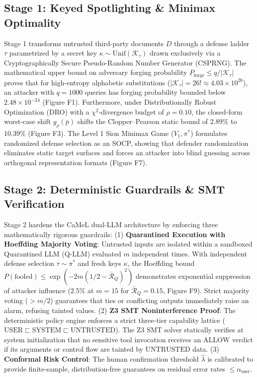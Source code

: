 \documentclass[10pt,a4paper]{article}
\begin{document}
\subsection{Stage 1: Keyed Spotlighting \& Minimax Optimality}
Stage 1 transforms untrusted third-party documents $D$ through a defense ladder $\tau$ parametrized by a secret key $\kappa \sim \mathrm{Unif}(\mathcal{K}_\tau)$ drawn exclusively via a Cryptographically Secure Pseudo-Random Number Generator (CSPRNG). The mathematical upper bound on adversary forging probability $P_{\mathrm{forge}} \le q / |\mathcal{K}_\tau|$ proves that for high-entropy alphabetic substitutions ($|\mathcal{K}_\tau| = 26! \approx 4.03 \times 10^{26}$), an attacker with $q = 1000$ queries has forging probability bounded below $2.48 \times 10^{-24}$ (Figure F1). Furthermore, under Distributionally Robust Optimization (DRO) with a $\chi^2$-divergence budget of $\rho = 0.10$, the closed-form worst-case shift $g_\rho(\bar{p})$ shifts the Clopper--Pearson static bound of $2.89\%$ to $10.39\%$ (Figure F3). The Level 1 Sion Minimax Game ($V_1, \pi^*$) formulates randomized defense selection as an SOCP, showing that defender randomization eliminates static target surfaces and forces an attacker into blind guessing across orthogonal representation formats (Figure F7).

\subsection{Stage 2: Deterministic Guardrails \& SMT Verification}
Stage 2 hardens the CaMeL dual-LLM architecture by enforcing three mathematically rigorous guardrails: (1) \textbf{Quarantined Execution with Hoeffding Majority Voting}: Untrusted inputs are isolated within a sandboxed Quarantined LLM (Q-LLM) evaluated $m$ independent times. With independent defense selection $\tau \sim \pi^*$ and fresh keys $\kappa$, the Hoeffding bound $P(\text{fooled}) \le \exp(-2m(1/2 - \bar{\mathcal{R}}_Q)^2)$ demonstrates exponential suppression of attacker influence ($2.5\%$ at $m=15$ for $\bar{\mathcal{R}}_Q = 0.15$, Figure F9). Strict majority voting ($> m/2$) guarantees that ties or conflicting outputs immediately raise an alarm, refusing tainted values. (2) \textbf{Z3 SMT Noninterference Proof}: The deterministic policy engine enforces a strict three-tier capability lattice ($\mathrm{USER} \sqsubset \mathrm{SYSTEM} \sqsubset \mathrm{UNTRUSTED}$). The Z3 SMT solver statically verifies at system initialization that no sensitive tool invocation receives an $\mathrm{ALLOW}$ verdict if its arguments or control flow are tainted by $\mathrm{UNTRUSTED}$ data. (3) \textbf{Conformal Risk Control}: The human confirmation threshold $\hat{\lambda}$ is calibrated to provide finite-sample, distribution-free guarantees on residual error rates $\le \alpha_{\mathrm{user}}$.
\end{document}
